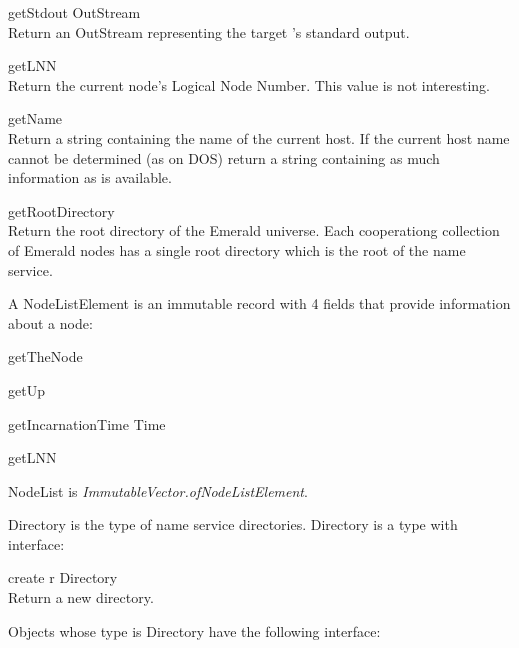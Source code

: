 \begin{desc}
  \item[\kw{operation} getStdout \returns{} \/\LB{}OutStream\/\RB{}]~\\
    Return an OutStream representing the target 's standard output.
  \item[\kw{function} getLNN \returns{} \/\LB{}\tn{Integer}\/\RB{}]~\\
    Return the current node's Logical Node Number.  This value is not
    interesting.
  \item[\kw{function} getName \returns{} \/\LB{}\tn{String}\/\RB{}]~\\
    Return a string containing the name of the current host.  If the current
    host name cannot be determined (as on DOS) return a string containing as
    much information as is available.
  \item[\kw{function} getRootDirectory \returns{} \/\LB{}\tn{Directory}\/\RB{}]~\\
    Return the root directory of the Emerald universe.  Each cooperationg
    collection of Emerald nodes has a single root directory which is the
    root of the name service.
\end{desc}

\noindent A NodeListElement is an immutable record with 4 fields that
provide information about a node:

\begin{desc}
  \item[\kw{function} getTheNode \returns{} \/\LB{}\tn{Node}\/\RB{}]
  \item[\kw{function} getUp \returns{} \/\LB{}\tn{Boolean}\/\RB{}]
  \item[\kw{function} getIncarnationTime \returns{} \/\LB{}Time\/\RB{}]
  \item[\kw{function} getLNN \returns{} \/\LB{}\tn{Integer}\/\RB{}]
\end{desc}

\noindent NodeList is 
{\it ImmutableVector.of\/\LB{}NodeListElement\/\RB{}}.

Directory is the type of name service directories.  Directory is a type with
interface:
\begin{desc}
  \item[\kw{operation} create \returns{} \/\LB{}r \CO{} Directory\/\RB{}]~\\
    Return a new directory.
\end{desc}

\noindent Objects whose type is Directory have the following
interface:

